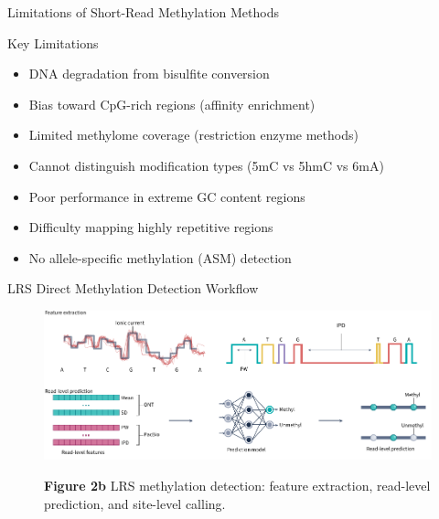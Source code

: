 \documentclass[aspectratio=169]{beamer}
\begin{document}
\begin{frame}{Limitations of Short-Read Methylation Methods}
  \begin{alertblock}{Key Limitations}
    \begin{itemize}
      \item DNA degradation from bisulfite conversion
      \item Bias toward CpG-rich regions (affinity enrichment)
      \item Limited methylome coverage (restriction enzyme methods)
      \item Cannot distinguish modification types (5mC vs 5hmC vs 6mA)
      \item Poor performance in extreme GC content regions
      \item Difficulty mapping highly repetitive regions
      \item No allele-specific methylation (ASM) detection
    \end{itemize}
  \end{alertblock}
\end{frame}

\begin{frame}{LRS Direct Methylation Detection Workflow}
  \begin{figure}
    \centering
    \includegraphics[height=0.5\textheight]{figures/fig2b.pdf}

    {\small \textbf{Figure 2b} \textbar{} LRS methylation detection: feature extraction, read-level prediction, and site-level calling.}
  \end{figure}
\end{frame}
\end{document}
